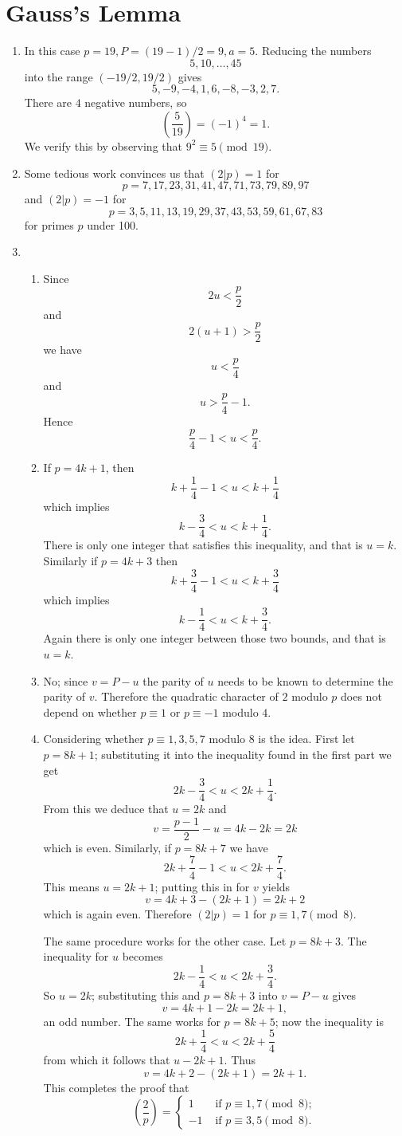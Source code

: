 \documentclass[a4paper]{article}
\newcommand{\leg}[2]{\left(\frac{#1}{#2}\right)}
\newcommand{\ileg}[2]{(#1|#2)}
\begin{document}
\section*{Gauss's Lemma}
\begin{enumerate}
\item In this case \(p=19, P=(19-1)/2=9, a=5.\)
Reducing the numbers \[5,10,\ldots,45\]
into the range \((-19/2,19/2)\) gives 
\[5,-9,-4,1,6,-8,-3,2,7.\]
There are \(4\) negative numbers, so
\[\leg{5}{19}=(-1)^4=1.\]
We verify this by observing that \(9^2\equiv5\pmod{19}.\)
\item Some tedious work convinces us that \(\ileg{2}{p}=1\)
	for \[p=7, 17, 23, 31, 41, 47, 71, 73, 79, 89, 97\]
		and \(\ileg{2}{p}=-1\)
		for \[p=3, 5, 11, 13, 19, 29, 37, 43, 53, 59, 61, 67, 83\]
		for primes \(p\) under 100.
\item \begin{enumerate}
		\item Since \[2u<\frac{p}{2}\] and \[2(u+1)>\frac{p}{2}\]
			we have \[u<\frac{p}{4}\] and \[u>\frac{p}{4}-1.\]
			Hence \[\frac{p}{4}-1<u<\frac{p}{4}.\]
		\item If \(p=4k+1\), then
			\[k+\frac{1}{4}-1<u<k+\frac{1}{4}\]
			which implies
			\[k-\frac{3}{4}<u<k+\frac{1}{4}.\]
			There is only one integer that satisfies this inequality, and that is \(u=k\).
			Similarly if \(p=4k+3\) then
			\[k+\frac{3}{4}-1<u<k+\frac{3}{4}\]
			which implies
			\[k-\frac{1}{4}<u<k+\frac{3}{4}.\]
			Again there is only one integer between
			those two bounds, and that is \(u=k\).
		\item No; since \(v=P-u\) the parity of \(u\)
			needs to be known to determine
			the parity of \(v\).
			Therefore the quadratic character of \(2\)
			modulo \(p\) does not depend on whether
			\(p\equiv1\) or \(p\equiv-1\) modulo \(4\).
		\item Considering whether \(p\equiv1,3,5,7\) modulo \(8\)
			is the idea.
	First let \(p=8k+1\); substituting it into the inequality
		found in the first part we get
		\[2k-\frac{3}{4}<u<2k+\frac{1}{4}.\]
		From this we deduce that \(u=2k\)
		and \[v=\frac{p-1}{2}-u=4k-2k=2k\] which is even.
		Similarly, if \(p=8k+7\) we have
		\[2k+\frac{7}{4}-1<u<2k+\frac{7}{4}.\]
		This means \(u=2k+1\); putting this in for \(v\)
		yields \[v=4k+3-(2k+1)=2k+2\] 
		which is again even. 
		Therefore \(\ileg{2}{p}=1\) for \(p\equiv1,7\pmod{8}.\)
		
		The same procedure works for the other case.
		Let \(p=8k+3\).
		The inequality for \(u\) becomes
		\[ 2k-\frac{1}{4}<u<2k+\frac{3}{4}.\]
		So \(u=2k\); substituting this and \(p=8k+3\)
		into \(v=P-u\) gives
		\[v=4k+1-2k=2k+1,\]
		an odd number.
		The same works for \(p=8k+5\); now the inequality
		is
		\[2k+\frac{1}{4}<u<2k+\frac{5}{4}\]
		from which it follows that \(u-2k+1\).
		Thus
		\[v=4k+2-(2k+1)=2k+1.\]
	This completes the proof that
		\[
			\leg{2}{p}=
			\begin{cases}
			1&\text{ if }p\equiv1,7\pmod{8};\\
				-1&\text{ if }p\equiv3,5\pmod{8}.
			\end{cases}
		\]
\end{enumerate}
\end{enumerate}
\end{document}
